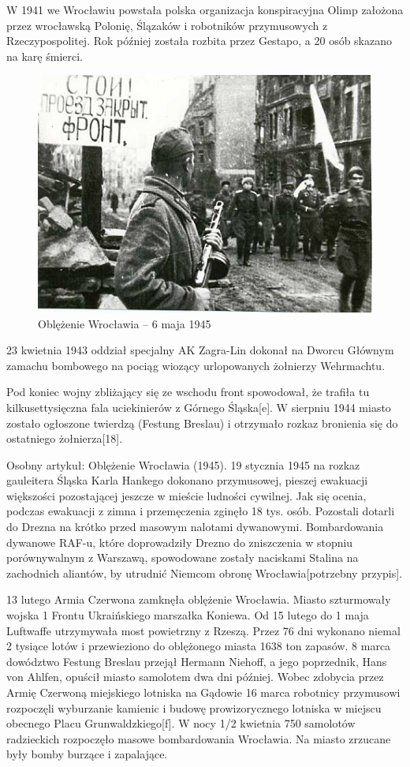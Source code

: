 \documentclass{article}
\begin{document}
W 1941 we Wrocławiu powstała polska organizacja konspiracyjna Olimp założona przez wrocławską Polonię, Ślązaków i robotników przymusowych z Rzeczypospolitej. Rok później została rozbita przez Gestapo, a 20 osób skazano na karę śmierci.
 \begin{figure}[h!]
\centering
\includegraphics[scale=0.8]{14.jpg}
\caption{Oblężenie Wrocławia – 6 maja 1945}
\end{figure}

23 kwietnia 1943 oddział specjalny AK Zagra-Lin dokonał na Dworcu Głównym zamachu bombowego na pociąg wiozący urlopowanych żołnierzy Wehrmachtu.

Pod koniec wojny zbliżający się ze wschodu front spowodował, że trafiła tu kilkusettysięczna fala uciekinierów z Górnego Śląska[e]. W sierpniu 1944 miasto zostało ogłoszone twierdzą (Festung Breslau) i otrzymało rozkaz bronienia się do ostatniego żołnierza[18].

 Osobny artykuł: Oblężenie Wrocławia (1945).
19 stycznia 1945 na rozkaz gauleitera Śląska Karla Hankego dokonano przymusowej, pieszej ewakuacji większości pozostającej jeszcze w mieście ludności cywilnej. Jak się ocenia, podczas ewakuacji z zimna i przemęczenia zginęło 18 tys. osób. Pozostali dotarli do Drezna na krótko przed masowym nalotami dywanowymi. Bombardowania dywanowe RAF-u, które doprowadziły Drezno do zniszczenia w stopniu porównywalnym z Warszawą, spowodowane zostały naciskami Stalina na zachodnich aliantów, by utrudnić Niemcom obronę Wrocławia[potrzebny przypis].

13 lutego Armia Czerwona zamknęła oblężenie Wrocławia. Miasto szturmowały wojska 1 Frontu Ukraińskiego marszałka Koniewa. Od 15 lutego do 1 maja Luftwaffe utrzymywała most powietrzny z Rzeszą. Przez 76 dni wykonano niemal 2 tysiące lotów i przewieziono do oblężonego miasta 1638 ton zapasów. 8 marca dowództwo Festung Breslau przejął Hermann Niehoff, a jego poprzednik, Hans von Ahlfen, opuścił miasto samolotem dwa dni później. Wobec zdobycia przez Armię Czerwoną miejskiego lotniska na Gądowie 16 marca robotnicy przymusowi rozpoczęli wyburzanie kamienic i budowę prowizorycznego lotniska w miejscu obecnego Placu Grunwaldzkiego[f]. W nocy 1/2 kwietnia 750 samolotów radzieckich rozpoczęło masowe bombardowania Wrocławia. Na miasto zrzucane były bomby burzące i zapalające.
\end{document}
